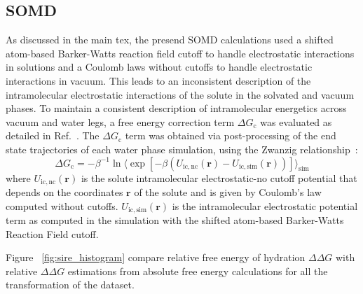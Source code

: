 \documentclass[journal=jctcce,manuscript=suppinfo]{achemso}
\begin{document}
\subsection{SOMD}
\label{sec:sire-probs}

As discussed in the main tex, the presend SOMD calculations used a shifted atom-based Barker-Watts reaction field cutoff to handle electrostatic interactions in solutions and a Coulomb laws without cutoffs to handle electrostatic interactions in vacuum. 
This leads to an inconsistent description of the intramolecular electrostatic interactions of the solute in the solvated and vacuum phases.   
To maintain a consistent description of intramolecular energetics across vacuum and water legs, 
a free energy correction term $\Delta G_{\mathrm{c}}$ was  evaluated as detailed in Ref.~.  
The $\Delta G_{\mathrm{c}}$ term was obtained via post-processing of the end state trajectories of each water phase simulation, using the Zwanzig relationship~\cite{zwanzig_high-temperature_1954}:
\begin{equation}
 \label{eq:ZwanzigDGfunc}
 \Delta G_{\mathrm{c}} = -\beta^{-1} \ln \langle \exp  \left[-\beta(U_{\mathrm{ic,nc}}(\mathbf{r}) -  U_{\mathrm{ic,sim}}(\mathbf{r}))\right]\rangle_{\mathrm{sim}}
\end{equation}
where $U_{\mathrm{ic,nc}}(\mathbf{r})$ is the solute intramolecular electrostatic-no cutoff potential that depends on the coordinates $\mathbf{r}$ of the solute and is given by Coulomb's law computed without cutoffs. 
$U_{\mathrm{ic,sim}}(\mathbf{r})$ is the intramolecular electrostatic potential term as computed in the simulation with the shifted atom-based Barker-Watts Reaction Field cutoff. 

Figure ~\ref{fig:sire_histogram} compare relative free energy of hydration $\Delta\Delta G$ with relative $\Delta\Delta G$ estimations from absolute free  
energy calculations for all the transformation of the dataset.

\end{document}
